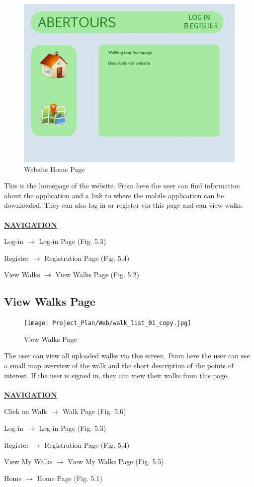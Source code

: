 \documentclass[12pt]{article}
\begin{document}
\begin{figure}[htp]
\centering

\includegraphics[scale=0.60]{Project_Plan/Web/homepage_01.jpg}
\caption{Website Home Page}
\label{Website Home Page}
\end{figure}
\par{This is the homepage of the website. From here the user can find information about the application and a link to where the mobile application can be downloaded. They can also log-in or register via this page and can view walks. \\ \\}
\textbf{\uline{NAVIGATION}}
\par{Log-in $\rightarrow$ Log-in Page (Fig. 5.3)}
\par{Register $\rightarrow$ Registration Page (Fig. 5.4)}
\par{View Walks $\rightarrow$ View Walks Page (Fig. 5.2)}
\clearpage
\subsection{View Walks Page}
\begin{figure}[htp]
\centering
\texttt{[image: Project\_Plan/Web/walk\_list\_01\_copy.jpg]}
\caption{View Walks Page}
\label{View Walks Page}
\end{figure}
\par{The user can view all uploaded walks via this screen. From here the user can see a small map overview of the walk and the short description of the points of interest. If the user is signed in, they can view their walks from this page. \\ \\}
\textbf{\uline{NAVIGATION}}
\par{Click on Walk $\rightarrow$ Walk Page (Fig. 5.6)}
\par{Log-in $\rightarrow$ Log-in Page (Fig. 5.3)}
\par{Register $\rightarrow$ Registration Page (Fig. 5.4)}
\par{View My Walks $\rightarrow$ View My Walks Page (Fig. 5.5)}
\par{Home $\rightarrow$ Home Page (Fig. 5.1)}
\clearpage
\end{document}

